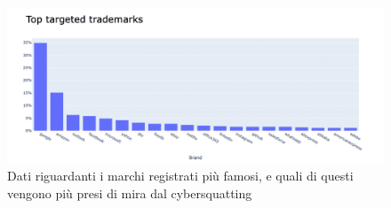 \begin{figure}[!h]
  \centering
  \begin{minipage}[b]{\textwidth}
    \includegraphics[width=\textwidth]{pictures/squatdata.png}
    \caption{Dati riguardanti i marchi registrati più famosi, e quali di questi vengono più presi di mira dal cybersquatting}
    \label{fig:squatdata}
  \end{minipage}
  \hfill
\end{figure}



